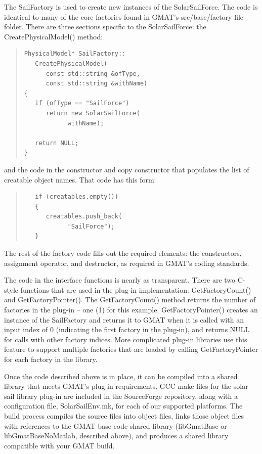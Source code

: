 The SailFactory is used to create new instances of the SolarSailForce.  The code
is identical to many of the core factories found in GMAT's src/base/factory file
folder.  There are three sections specific to the SolarSailForce: the
CreatePhysicalModel() method:

\begin{quote}
\begin{verbatim}
PhysicalModel* SailFactory::
   CreatePhysicalModel(
      const std::string &ofType,
      const std::string &withName)
{
   if (ofType == "SailForce")
      return new SolarSailForce(
            withName);

   return NULL;
}
\end{verbatim}
\end{quote}

\noindent and the code in the constructor and copy constructor that populates
the list of creatable object names.  That code has this form:

\begin{quote}
\begin{verbatim}
   if (creatables.empty())
   {
      creatables.push_back(
            "SailForce");
   }
\end{verbatim}
\end{quote}

\noindent The rest of the factory code fills out the required elements: the
constructors, assignment operator, and destructor, as required in GMAT's coding
standards\cite{codeStandards}.

The code in the interface functions is nearly as transparent.  There are two
C-style functions that are used in the plug-in implementation: GetFactoryCount()
and GetFactoryPointer().  The GetFactoryCount() method returns the number of
factories in the plug-in -- one (1) for this example.  GetFactoryPointer()
creates an instance of the SailFactory and returns it to GMAT when it is called
with an input index of 0 (indicating the first factory in the plug-in), and
returns NULL for calls with other factory indices.  More complicated plug-in
libraries use this feature to support multiple factories that are loaded by
calling GetFactoryPointer for each factory in the library.

Once the code described above is in place, it can be compiled into a shared
library that meets GMAT's plug-in requirements.  GCC make files for the solar
sail library plug-in are included in the SourceForge repository, along with a
configuration file, SolarSailEnv.mk, for each of our supported platforms.  The
build process compiles the source files into object files, links those object
files with references to the GMAT base code shared library (libGmatBase or
libGmatBaseNoMatlab, described above), and produces a shared library compatible
with your GMAT build.

